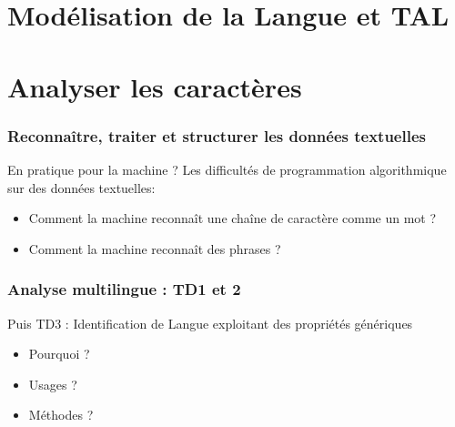 \section{Modélisation de la Langue et TAL}


\section{Analyser les caractères }
\begin{frame}
\frametitle{Reconnaître, traiter et structurer les données textuelles}
En pratique pour la machine ?
Les difficultés de programmation algorithmique sur des données textuelles: \\
\begin{itemize}
    \item Comment la machine reconnaît une chaîne de caractère comme un mot ? 

     \item Comment la machine reconnaît des phrases ?
\end{itemize}


\end{frame}


\begin{frame}
\frametitle{Analyse multilingue :  TD1 et 2}

Puis TD3 : Identification de Langue exploitant des propriétés génériques  \\

\begin{itemize}
    \item Pourquoi ?
     \item Usages ?
     \item Méthodes ?
\end{itemize}
\end{frame}



